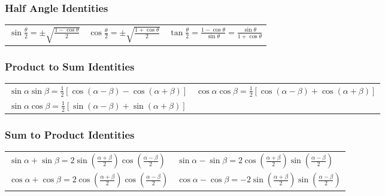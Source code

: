 \subsubsection{Half Angle Identities}

\begin{tabular}{m{5.5cm} m{5.5cm} m}
    $\sin \frac{\theta}{2}=\pm \sqrt{\frac{1-\cos \theta}{2}}$ & $\cos \frac{\theta}{2}=\pm \sqrt{\frac{1+\cos \theta}{2}}$ & $\tan \frac{\theta}{2}=\frac{1-\cos \theta}{\sin \theta}=\frac{\sin \theta}{1+\cos \theta}$ \\
\end{tabular}

\subsubsection{Product to Sum Identities}

\begin{tabular}{m{8cm} m}
    $\sin \alpha \sin \beta=\frac{1}{2}[\cos (\alpha-\beta)-\cos (\alpha+\beta)]$ & $\cos \alpha \cos \beta=\frac{1}{2}[\cos (\alpha-\beta)+\cos (\alpha+\beta)]$\\
    $\sin \alpha \cos \beta=\frac{1}{2}[\sin (\alpha-\beta)+\sin (\alpha+\beta)]$ &
\end{tabular}

\subsubsection{Sum to Product Identities}

\begin{tabular}{m{8cm} m}
    $\sin \alpha+\sin \beta=2 \sin \left(\frac{\alpha+\beta}{2}\right) \cos \left(\frac{\alpha-\beta}{2}\right)$ & $ \sin \alpha-\sin \beta=2 \cos \left(\frac{\alpha+\beta}{2}\right) \sin \left(\frac{\alpha-\beta}{2}\right)$\\
    $\cos \alpha+\cos \beta=2 \cos \left(\frac{\alpha+\beta}{2}\right) \cos \left(\frac{\alpha-\beta}{2}\right)$ & $\cos \alpha-\cos \beta=-2 \sin \left(\frac{\alpha+\beta}{2}\right) \sin \left(\frac{\alpha-\beta}{2}\right)$
\end{tabular}
